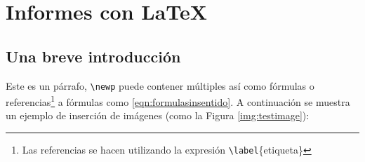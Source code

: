 %
%

\section{Informes con \LaTeX}
	
	\subsection{Una breve introducción}
		
		\lipsum[4]
		
		
		Este es un párrafo, \texttt{\textbackslash newp} puede contener múltiples  así como fórmulas o referencias\footnote{Las referencias se hacen utilizando la expresión \texttt{\textbackslash label}\{etiqueta\}} a fórmulas como \eqref{eqn:formulasinsentido}. A continuación se muestra un ejemplo de inserción de imágenes (como la Figura \ref{img:testimage}):
		
